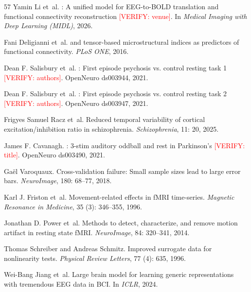 \documentclass{article}
\newcommand{\verify}[1]{\textcolor{red}{[VERIFY: #1]}}
\begin{document}
\begin{thebibliography}{57}
Yamin Li et~al.
: A unified model for {EEG}-to-{BOLD} translation and functional connectivity reconstruction \verify{venue}.
\newblock In \emph{Medical Imaging with Deep Learning (MIDL)}, 2026.

Fani Deligianni et~al.
 and tensor-based microstructural indices as predictors of functional connectivity.
\newblock \emph{PLoS ONE}, 2016.

Dean F. Salisbury et~al.
: First episode psychosis vs. control resting task 1 \verify{authors}.
\newblock OpenNeuro ds003944, 2021.

Dean F. Salisbury et~al.
: First episode psychosis vs. control resting task 2 \verify{authors}.
\newblock OpenNeuro ds003947, 2021.

Frigyes Samuel Racz et~al.
\newblock Reduced temporal variability of cortical excitation/inhibition ratio in schizophrenia.
\newblock \emph{Schizophrenia}, 11: 20, 2025.

James F. Cavanagh.
: 3-stim auditory oddball and rest in {Parkinson's} \verify{title}.
\newblock OpenNeuro ds003490, 2021.

Ga{\"e}l Varoquaux.
\newblock Cross-validation failure: Small sample sizes lead to large error bars.
\newblock \emph{NeuroImage}, 180: 68--77, 2018.

Karl J. Friston et~al.
\newblock Movement-related effects in {fMRI} time-series.
\newblock \emph{Magnetic Resonance in Medicine}, 35 (3): 346--355, 1996.

Jonathan D. Power et~al.
\newblock Methods to detect, characterize, and remove motion artifact in resting state {fMRI}.
\newblock \emph{NeuroImage}, 84: 320--341, 2014.

Thomas Schreiber and Andreas Schmitz.
\newblock Improved surrogate data for nonlinearity tests.
\newblock \emph{Physical Review Letters}, 77 (4): 635, 1996.

Wei-Bang Jiang et~al.
\newblock Large brain model for learning generic representations with tremendous {EEG} data in {BCI}.
\newblock In \emph{ICLR}, 2024.

\end{thebibliography}
\end{document}
